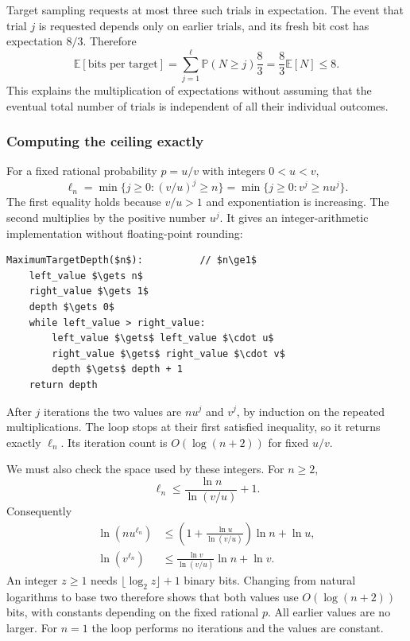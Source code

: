 \documentclass[11pt,a4paper]{article}
\theoremstyle{readable}
\newcommand{\E}{\mathbb E}
\newcommand{\Prob}{\mathbb P}
\begin{document}
Target sampling requests at most three such trials in expectation.
The event that trial $j$ is requested depends only on earlier trials,
and its fresh bit cost has expectation $8/3$. Therefore
\[
  \E[\text{bits per target}]
    =\sum_{j=1}^\ell\Prob(N\ge j)\frac83
    =\frac83\E[N]\le8.
\]
This explains the multiplication of expectations without assuming
that the eventual total number of trials is independent of all their
individual outcomes.

\subsubsection*{Computing the ceiling exactly}
For a fixed rational probability $p=u/v$ with integers $0<u<v$,
\[
  \ell_n=\min\{j\ge0:(v/u)^j\ge n\}
        =\min\{j\ge0:v^j\ge nu^j\}.
\]
The first equality holds because $v/u>1$ and exponentiation is
increasing. The second multiplies by the positive number $u^j$.
It gives an integer-arithmetic implementation without floating-point
rounding:

\noindent\begin{minipage}{\linewidth}
\begin{lstlisting}[caption={Exact maximum target depth for fixed $p=u/v$.}]
MaximumTargetDepth($n$):          // $n\ge1$
    left_value $\gets n$
    right_value $\gets 1$
    depth $\gets 0$
    while left_value > right_value:
        left_value $\gets$ left_value $\cdot u$
        right_value $\gets$ right_value $\cdot v$
        depth $\gets$ depth + 1
    return depth
\end{lstlisting}
\end{minipage}

After $j$ iterations the two values are $nu^j$ and $v^j$, by induction
on the repeated multiplications. The loop stops at their first
satisfied inequality, so it returns exactly $\ell_n$. Its iteration
count is $O(\log(n+2))$ for fixed $u/v$.

We must also check the space used by these integers. For $n\ge2$,
\[
  \ell_n\le\frac{\ln n}{\ln(v/u)}+1.
\]
Consequently
\begin{align*}
  \ln(nu^{\ell_n})
     &\le\left(1+\frac{\ln u}{\ln(v/u)}\right)\ln n+\ln u,\\
  \ln(v^{\ell_n})
     &\le\frac{\ln v}{\ln(v/u)}\ln n+\ln v.
\end{align*}
An integer $z\ge1$ needs $\lfloor\log_2 z\rfloor+1$ binary bits.
Changing from natural logarithms to base two therefore shows that
both values use $O(\log(n+2))$ bits, with constants depending on
the fixed rational $p$. All earlier values are no larger. For $n=1$
the loop performs no iterations and the values are constant.
\end{document}
